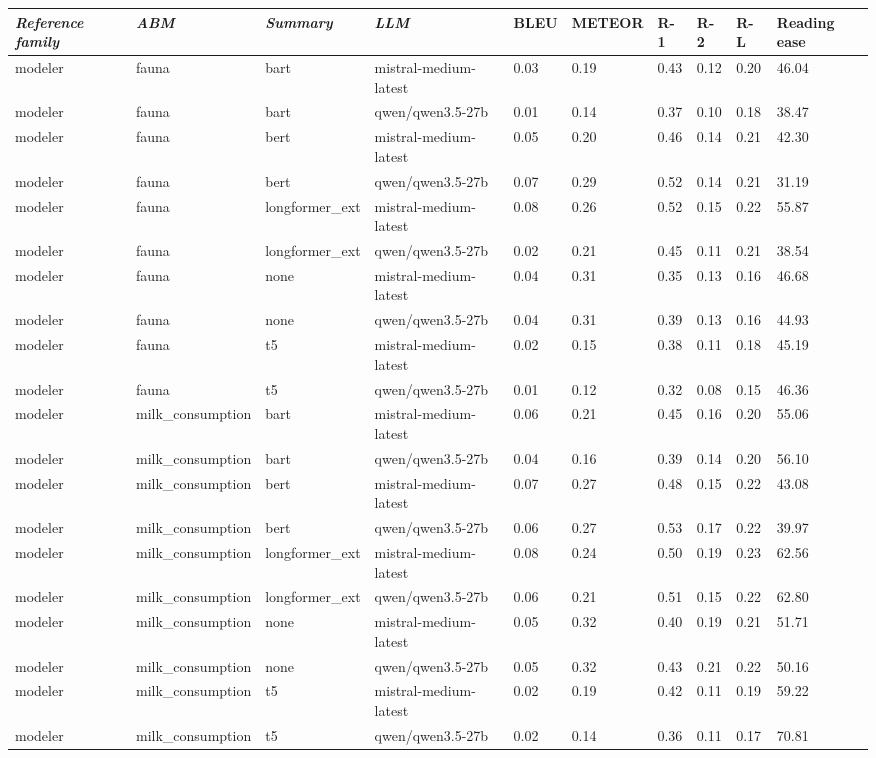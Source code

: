 \begin{tabular}{|l|l|l|l|l|l|l|l|l|l|}
\hline
\textit{\textbf{Reference family}} & \textit{\textbf{ABM}} & \textit{\textbf{Summary}} & \textit{\textbf{LLM}} & BLEU & METEOR & R-1 & R-2 & R-L & Reading ease \\
 \hline
 modeler & fauna & bart & mistral-medium-latest & 0.03 & 0.19 & 0.43 & 0.12 & 0.20 & 46.04 \\
 \hline
 modeler & fauna & bart & qwen/qwen3.5-27b & 0.01 & 0.14 & 0.37 & 0.10 & 0.18 & 38.47 \\
 \hline
 modeler & fauna & bert & mistral-medium-latest & 0.05 & 0.20 & 0.46 & 0.14 & 0.21 & 42.30 \\
 \hline
 modeler & fauna & bert & qwen/qwen3.5-27b & 0.07 & 0.29 & 0.52 & 0.14 & 0.21 & 31.19 \\
 \hline
 modeler & fauna & longformer\_ext & mistral-medium-latest & 0.08 & 0.26 & 0.52 & 0.15 & 0.22 & 55.87 \\
 \hline
 modeler & fauna & longformer\_ext & qwen/qwen3.5-27b & 0.02 & 0.21 & 0.45 & 0.11 & 0.21 & 38.54 \\
 \hline
 modeler & fauna & none & mistral-medium-latest & 0.04 & 0.31 & 0.35 & 0.13 & 0.16 & 46.68 \\
 \hline
 modeler & fauna & none & qwen/qwen3.5-27b & 0.04 & 0.31 & 0.39 & 0.13 & 0.16 & 44.93 \\
 \hline
 modeler & fauna & t5 & mistral-medium-latest & 0.02 & 0.15 & 0.38 & 0.11 & 0.18 & 45.19 \\
 \hline
 modeler & fauna & t5 & qwen/qwen3.5-27b & 0.01 & 0.12 & 0.32 & 0.08 & 0.15 & 46.36 \\
 \hline
 modeler & milk\_consumption & bart & mistral-medium-latest & 0.06 & 0.21 & 0.45 & 0.16 & 0.20 & 55.06 \\
 \hline
 modeler & milk\_consumption & bart & qwen/qwen3.5-27b & 0.04 & 0.16 & 0.39 & 0.14 & 0.20 & 56.10 \\
 \hline
 modeler & milk\_consumption & bert & mistral-medium-latest & 0.07 & 0.27 & 0.48 & 0.15 & 0.22 & 43.08 \\
 \hline
 modeler & milk\_consumption & bert & qwen/qwen3.5-27b & 0.06 & 0.27 & 0.53 & 0.17 & 0.22 & 39.97 \\
 \hline
 modeler & milk\_consumption & longformer\_ext & mistral-medium-latest & 0.08 & 0.24 & 0.50 & 0.19 & 0.23 & 62.56 \\
 \hline
 modeler & milk\_consumption & longformer\_ext & qwen/qwen3.5-27b & 0.06 & 0.21 & 0.51 & 0.15 & 0.22 & 62.80 \\
 \hline
 modeler & milk\_consumption & none & mistral-medium-latest & 0.05 & 0.32 & 0.40 & 0.19 & 0.21 & 51.71 \\
 \hline
 modeler & milk\_consumption & none & qwen/qwen3.5-27b & 0.05 & 0.32 & 0.43 & 0.21 & 0.22 & 50.16 \\
 \hline
 modeler & milk\_consumption & t5 & mistral-medium-latest & 0.02 & 0.19 & 0.42 & 0.11 & 0.19 & 59.22 \\
 \hline
 modeler & milk\_consumption & t5 & qwen/qwen3.5-27b & 0.02 & 0.14 & 0.36 & 0.11 & 0.17 & 70.81 \\
\hline
\end{tabular}
